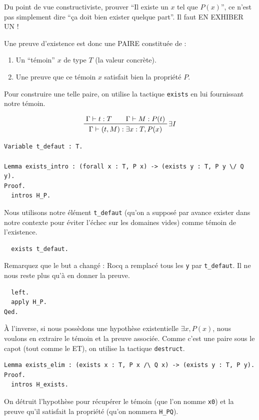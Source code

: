 \documentclass[11pt,a4paper]{article}
\begin{document}
Du point de vue constructiviste, prouver ``Il existe un $x$ tel que $P(x)$'', ce n'est pas simplement dire ``ça doit bien exister quelque part''. Il faut EN EXHIBER UN !

Une preuve d'existence est donc une PAIRE constituée de :
\begin{enumerate}
  \item Un ``témoin'' $x$ de type $T$ (la valeur concrète).
  \item Une preuve que ce témoin $x$ satisfait bien la propriété $P$.
\end{enumerate}

Pour construire une telle paire, on utilise la tactique \texttt{exists} en lui fournissant notre témoin.

$$\prftree[r]{${\exists}I$}{\Gamma \vdash t : T \qquad \Gamma \vdash M : P(t)}{\Gamma \vdash (t, M) : \exists x : T, P(x)}$$

\begin{lstlisting}
Variable t_defaut : T.

Lemma exists_intro : (forall x : T, P x) -> (exists y : T, P y \/ Q y).
Proof.
  intros H_P.
\end{lstlisting}

Nous utilisons notre élément \texttt{t\_defaut} (qu'on a supposé par avance exister dans notre contexte pour éviter l'échec sur les domaines vides) comme témoin de l'existence.

\begin{lstlisting}
  exists t_defaut.
\end{lstlisting}

Remarquez que le but a changé : Rocq a remplacé tous les \texttt{y} par \texttt{t\_defaut}. Il ne nous reste plus qu'à en donner la preuve.

\begin{lstlisting}
  left.
  apply H_P.
Qed.
\end{lstlisting}

À l'inverse, si nous possèdons une hypothèse existentielle $\exists x, P(x)$, nous voulons en extraire le témoin et la preuve associée. Comme c'est une paire sous le capot (tout comme le ET), on utilise la tactique \texttt{destruct}.

\begin{lstlisting}
Lemma exists_elim : (exists x : T, P x /\ Q x) -> (exists y : T, P y).
Proof.
  intros H_exists.
\end{lstlisting}

On détruit l'hypothèse pour récupérer le témoin (que l'on nomme \texttt{x0}) et la preuve qu'il satisfait la propriété (qu'on nommera \texttt{H\_PQ}).
\end{document}
